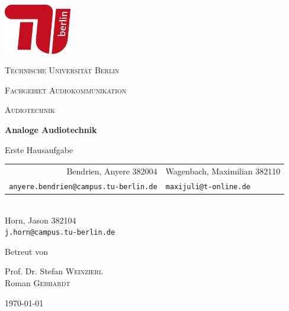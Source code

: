 \begin{titlepage}
    \centering
    \includegraphics[height=62pt]{tu_red.png}\par
    {\scshape\huge Technische Universität Berlin \par}
    {\scshape\Large Fachgebiet Audiokommunikation\par}
    \vspace{1.5cm}
    {\scshape\LARGE Audiotechnik\par}
    \vspace{1.5cm}

    {\Huge\bfseries {Analoge Audiotechnik}\par}
    \vspace{0.1cm}
    {\large Erste Hausaufgabe\par}
    \vspace{1cm}

    {\itshape
        \begin{tabular}{rl}
          Bendrien, Anyere 382004 &
          Wagenbach, Maximilian 382110 \\
          \vspace{0.2cm}
          \small \texttt{anyere.bendrien@campus.tu-berlin.de} &
          \small \texttt{maxijuli@t-online.de}
        \end{tabular}\\
        Horn, Jason 382104 \\
        \small \texttt{j.horn@campus.tu-berlin.de} 
    }
    \vfill
    
    Betreut von\par
    Prof. Dr. Stefan \textsc{Weinzierl} \\
    Roman \textsc{Gebhardt}
    \vspace{1cm}
    
    {\large \today\par}
\end{titlepage}